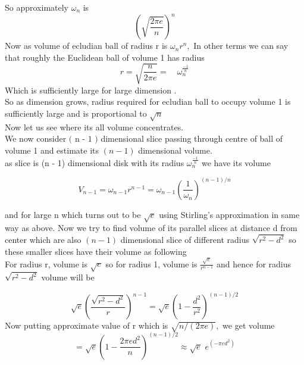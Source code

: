 \documentclass[oneside]{book}
\begin{document}
	So  approximately $\omega_{n}$ is 
	$$\left(\sqrt{\frac{2 \pi e}{n}}\right)^{n}$$
	Now as volume of ecludian ball of radius r is $\omega_{n} r^{n}, $
	In other terms we can say that roughly the Euclidean ball of volume 1 has radius 
	\[
	r =  \sqrt{\frac{n}{2 \pi e}}   = \quad \omega_{n}^{\frac{-1}{n}}
	\]
	Which is sufficiently large for large dimension
	. \\
	So as dimension grows, radius required  for ecludian ball to occupy volume 1 is sufficiently large and is
	proportional to $\sqrt{n}$ \\
	Now let us  see where its  all volume concentrates.\\
	We now consider $\text{( n - 1 )}$ dimensional slice passing through centre of ball of volume 1 and estimate its $( n-1 )$  dimensional volume.\\
	as slice is (n - 1) dimensional disk with its radius $\omega_{n}^{\frac{-1}{n}}$ we have its volume 
	
	$$ V_{n - 1} = \omega_{n-1} r^{n-1}=\omega_{n-1}\left(\frac{1}{\omega_{n}}\right)^{(n-1) / n}$$
	
	and for large n	which turns out to be $\sqrt{e} $ using Stirling's approximation in same way as above. Now we try to find volume of  its parallel slices at distance d from center which are also $(n - 1)$ dimensional slice of different radius $\sqrt{r^2- d^2}$ so these smaller slices have their volume as following \\
	For radius r, volume is $\sqrt{e}$ so for radius 1, volume is $\frac{\sqrt{e}}{r^{n-1}}$ and hence for radius $\sqrt{r^2- d^2}$ volume will be 
	
	
	\[
	\sqrt{e}\left(\frac{\sqrt{r^{2}-d^{2}}}{r}\right)^{n-1}=\sqrt{e}\left(1-\frac{d^{2}}{r^{2}}\right)^{(n-1) / 2}
	\]
	Now putting approximate value of r which is $\sqrt{n /(2 \pi e)},$ we get volume 
	\[
	= \sqrt{e}\left(1-\frac{2	 \pi e d^{2}}{n}\right)^{(n-1) / 2} \approx \sqrt{e} \hspace{4pt} e^{\left(-\pi e d^{2}\right)}
	\]
	
\end{document}
